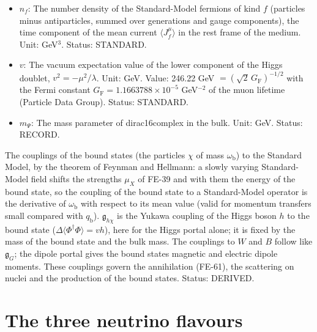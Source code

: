 \documentclass[
  10pt,
]{article}
\begin{document}
\begin{itemize}
  GeV\(^2\) (field strength). Status: AUTHOR.
\item
  \(n_f\): The number density of the Standard-Model fermions of kind
  \(f\) (particles minus antiparticles, summed over generations and
  gauge components), the time component of the mean current
  \(\langle J_f^\mu\rangle\) in the rest frame of the medium. Unit:
  GeV\(^3\). Status: STANDARD.
\item
  \(v\): The vacuum expectation value of the lower component of the
  Higgs doublet, \(v^2 = -\mu^2/\lambda\). Unit: GeV. Value: 246.22 GeV
  \(= (\sqrt2\,G_{\mathrm{F}})^{-1/2}\) with the Fermi constant
  \(G_{\mathrm{F}} = 1.1663788\times10^{-5}\) GeV\(^{-2}\) of the muon
  lifetime (Particle Data Group). Status: STANDARD.
\item
  \(m_\Psi\): The mass parameter of dirac16complex in the bulk. Unit:
  GeV. Status: RECORD.
\end{itemize}

The couplings of the bound states (the particles \(\chi\) of mass
\(\omega_{\mathrm{b}}\)) to the Standard Model, by the theorem of
Feynman and Hellmann: a slowly varying Standard-Model field shifts the
strengths \(\mu_X\) of FE-39 and with them the energy of the bound
state, so the coupling of the bound state to a Standard-Model operator
is the derivative of \(\omega_{\mathrm{b}}\) with respect to its mean
value (valid for momentum transfers small compared with
\(q_{\mathrm{b}}\)). \(\mathfrak{g}_{h\chi}\) is the Yukawa coupling of
the Higgs boson \(h\) to the bound state
(\(\Delta\langle\Phi^\dagger\Phi\rangle = vh\)), here for the Higgs
portal alone; it is fixed by the mass of the bound state and the bulk
mass. The couplings to \(W\) and \(B\) follow like \(\mathfrak{g}_{G}\);
the dipole portal gives the bound states magnetic and electric dipole
moments. These couplings govern the annihilation (FE-61), the scattering
on nuclei and the production of the bound states. Status: DERIVED.

\hypertarget{the-three-neutrino-flavours}{%
\section{The three neutrino
flavours}\label{the-three-neutrino-flavours}}
\end{document}
